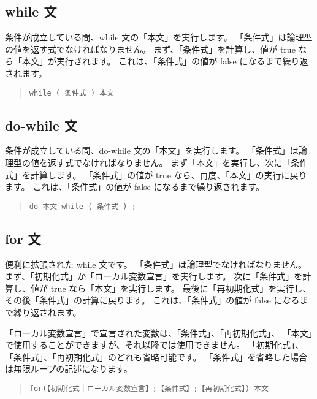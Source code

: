 \subsection{while 文}

条件が成立している間、while 文の「本文」を実行します。
「条件式」は論理型の値を返す式でなければなりません。
まず、「条件式」を計算し、値が true なら「本文」が実行されます。
これは、「条件式」の値が false になるまで繰り返されます。

\begin{quote}
\begin{verbatim}
while ( 条件式 ) 本文
\end{verbatim}
\end{quote}

\subsection{do-while 文}

条件が成立している間、do-while 文の「本文」を実行します。
「条件式」は論理型の値を返す式でなければなりません。
まず「本文」を実行し、次に「条件式」を計算します。
「条件式」の値が true なら、再度、「本文」の実行に戻ります。
これは、「条件式」の値が false になるまで繰り返されます。

\begin{quote}
\begin{verbatim}
do 本文 while ( 条件式 ) ;
\end{verbatim}
\end{quote}

\subsection{for 文}

便利に拡張された while 文です。
「条件式」は論理型でなければなりません。
まず、「初期化式」か「ローカル変数宣言」を実行します。
次に「条件式」を計算し、値が true なら「本文」を実行します。
最後に「再初期化式」を実行し、その後「条件式」の計算に戻ります。
これは、「条件式」の値が false になるまで繰り返されます。

「ローカル変数宣言」で宣言された変数は、「条件式」、「再初期化式」、
「本文」で使用することができますが、それ以降では使用できません。
「初期化式」、「条件式」、「再初期化式」のどれも省略可能です。
「条件式」を省略した場合は無限ループの記述になります。

\begin{quote}
\begin{verbatim}
for(【初期化式｜ローカル変数宣言】;【条件式】;【再初期化式】) 本文
\end{verbatim}
\end{quote}

